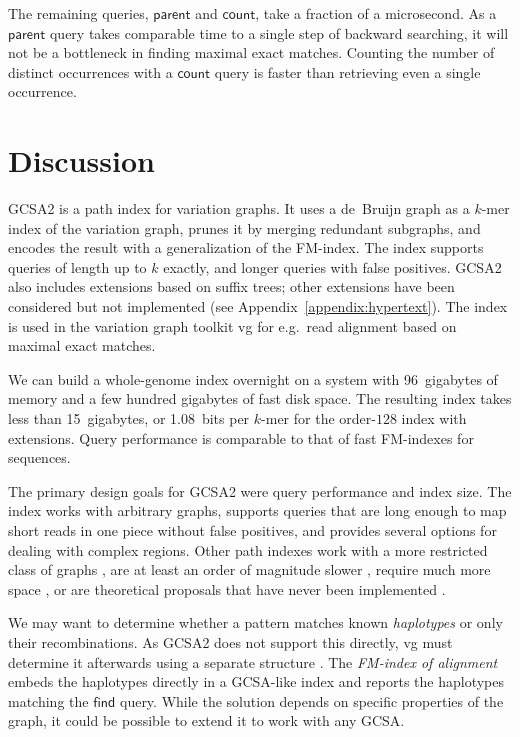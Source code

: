 \documentclass[twoside,leqno,twocolumn]{article}
\newcommand{\find}{\ensuremath{\mathsf{find}}}
\newcommand{\parent}{\ensuremath{\mathsf{parent}}}
\newcommand{\countq}{\ensuremath{\mathsf{count}}}
\newcommand{\kmer}[1]{$#1$\nobreakdash-mer}
\newcommand{\orderk}[1]{order\nobreakdash-$#1$}
\begin{document}
The remaining queries, $\parent$ and $\countq$, take a fraction of a microsecond. As a $\parent$ query takes comparable time to a single step of backward searching, it will not be a bottleneck in finding maximal exact matches. Counting the number of distinct occurrences with a $\countq$ query is faster than retrieving even a single occurrence.


\section{Discussion}

GCSA2 is a path index for variation graphs. It uses a de~Bruijn graph as a \kmer{k} index of the variation graph, prunes it by merging redundant subgraphs, and encodes the result with a generalization of the FM\nobreakdash-index. The index supports queries of length up to $k$ exactly, and longer queries with false positives. GCSA2 also includes extensions based on suffix trees; other extensions have been considered but not implemented (see Appendix~\ref{appendix:hypertext}). The index is used in the variation graph toolkit vg for e.g.~read alignment based on maximal exact matches.

We can build a whole-genome index overnight on a system with 96~gigabytes of memory and a few hundred gigabytes of fast disk space. The resulting index takes less than 15~gigabytes, or 1.08~bits per \kmer{k} for the \orderk{128} index with extensions. Query performance is comparable to that of fast FM-indexes for sequences.

The primary design goals for GCSA2 were query performance and index size. The index works with arbitrary graphs, supports queries that are long enough to map short reads in one piece without false positives, and provides several options for dealing with complex regions. Other path indexes work with a more restricted class of graphs \cite{Siren2014,Huang2013,Kim2015-2016,Maciuca2016}, are at least an order of magnitude slower \cite{Huang2013,Maciuca2016}, require much more space \cite{Bowe2012,Pell2012,Cazaux2014,Marcus2014}, or are theoretical proposals that have never been implemented \cite{Thachuk2013}.

We may want to determine whether a pattern matches known \emph{haplotypes} or only their recombinations. As GCSA2 does not support this directly, vg must determine it afterwards using a separate structure \cite{Novak2016}. The \emph{FM\nobreakdash-index of alignment} \cite{Na2015,Na2016} embeds the haplotypes directly in a GCSA-like index and reports the haplotypes matching the $\find$ query. While the solution depends on specific properties of the graph, it could be possible to extend it to work with any GCSA.
\end{document}
